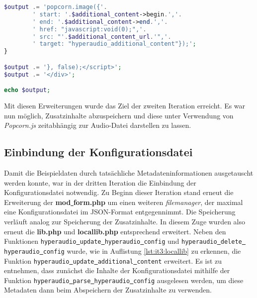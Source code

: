 \begin{lstlisting}[language=php,
             linewidth=\textwidth,
             caption={Ausschnitt der \textbf{renderer.php} in der 2. Iteration},
             label={lst:it2:renderer}]
    $output .= 'popcorn.image({'.
        ' start: '.$additional_content->begin.','.
        ' end: '.$additional_content->end.','.
        ' href: "javascript:void(0);",'.
        ' src: "'.$additional_content_url.'",'.
        ' target: "hyperaudio_additional_content"});';
}

$output .= '}, false);</script>';
$output .= '</div>';

echo $output;
\end{lstlisting}

Mit diesen Erweiterungen wurde das Ziel der zweiten Iteration erreicht. Es war nun möglich, Zusatzinhalte abzuspeichern und diese unter Verwendung von \textit{Popcorn.js} zeitabhängig zur Audio-Datei darstellen zu lassen.

\subsection{Einbindung der Konfigurationsdatei}
Damit die Beispieldaten durch tatsächliche Metadateninformationen ausgetauscht werden konnte, war in der dritten Iteration die Einbindung der Konfigurationsdatei notwendig. Zu Beginn dieser Iteration stand erneut die Erweiterung der \textbf{mod\underline{{ }}form.php} um einen weiteren \textit{filemanager}, der maximal eine Konfigurationsdatei im JSON-Format entgegennimmt. Die Speicherung verläuft analog zur Speicherung der Zusatzinhalte. In diesem Zuge wurden also erneut die \textbf{lib.php} und \textbf{locallib.php} entsprechend erweitert. Neben den Funktionen \texttt{hyperaudio\underline{{ }}update\underline{{ }}hyperaudio\underline{{ }}config} und \texttt{hyperaudio\underline{{ }}delete\underline{{ }}hyperaudio\underline{{ }}config} wurde, wie in Auflistung \ref{lst:it3:locallib} zu erkennen, die Funktion \texttt{hyperaudio\underline{{ }}update\underline{{ }}additional\underline{{ }}content} erweitert. Es ist zu entnehmen, dass zunächst die Inhalte der Konfigurationsdatei mithilfe der Funktion \texttt{hyperaudio\underline{{ }}parse\underline{{ }}hyperaudio\underline{{ }}config} ausgelesen werden, um diese Metadaten dann beim Abspeichern der Zusatzinhalte zu verwenden.

